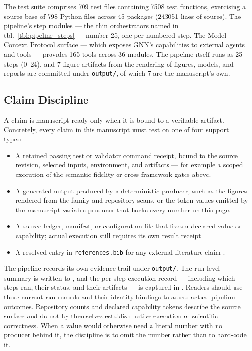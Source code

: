 \documentclass[
  english,
  9pt,
]{extarticle}
\providecommand{\tightlist}{%
  \setlength{\itemsep}{0pt}\setlength{\parskip}{0pt}}
\begin{document}
The test suite comprises 709 test files containing 7508 test functions,
exercising a source base of 798 Python files across 45 packages (243051
lines of source). The pipeline's step modules --- the thin orchestrators
named in tbl.~\ref{tbl:pipeline_steps} --- number 25, one per numbered
step. The Model Context Protocol surface --- which exposes GNN's
capabilities to external agents and tools --- provides 165 tools across
36 modules. The pipeline itself runs as 25 steps (0--24), and 7 figure
artifacts from the rendering of figures, models, and reports are
committed under \texttt{output/}, of which 7 are the manuscript's own.

\subsection{Claim Discipline}\label{claim-discipline}

A claim is manuscript-ready only when it is bound to a verifiable
artifact. Concretely, every claim in this manuscript must rest on one of
four support types:

\begin{itemize}
\tightlist
\item
  A retained passing test or validator command receipt, bound to the
  source revision, selected inputs, environment, and artifacts --- for
  example a scoped execution of the semantic-fidelity or cross-framework
  gates above.
\item
  A generated output produced by a deterministic producer, such as the
  figures rendered from the family and repository scans, or the token
  values emitted by the manuscript-variable producer that backs every
  number on this page.
\item
  A source ledger, manifest, or configuration file that fixes a declared
  value or capability; actual execution still requires its own result
  receipt.
\item
  A resolved entry in \texttt{references.bib} for any
  external-literature claim \citep{friston2010, parr2022}.
\end{itemize}

The pipeline records its own evidence trail under \texttt{output/}. The
run-level summary is written to , and
the per-step execution record --- including which steps ran, their
status, and their artifacts --- is captured in
. Readers should use those
current-run records and their identity bindings to assess actual
pipeline outcomes. Repository counts and declared capability tokens
describe the source surface and do not by themselves establish native
execution or scientific correctness. When a value would otherwise need a
literal number with no producer behind it, the discipline is to omit the
number rather than to hard-code it.
\end{document}
